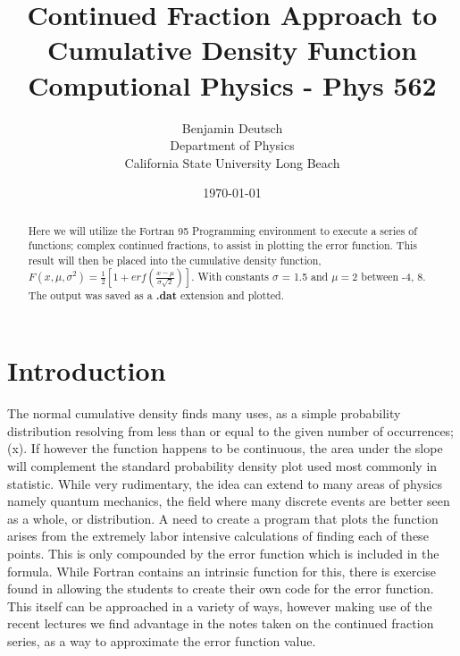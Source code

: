 \documentclass[12pt,letterpaper,notitlepage]{article}
\begin{document}




\title{%
	Continued Fraction Approach to Cumulative Density Function \\
\large Computional Physics - Phys 562}
\author{Benjamin Deutsch  \\
Department of Physics\\
California State University Long Beach}
\date{\today }

  
\maketitle



\begin{abstract}
Here we will utilize the Fortran 95 Programming environment to execute a series of functions; complex continued fractions, to assist in plotting the error function. This result will then be placed into the cumulative density function, ${F(x, \mu, \sigma^2) =\frac{1}{2}} \left[1+ erf \left( \frac{x -\mu}{\sigma\sqrt{2}} \right) \right]$. With constants ${\sigma}$ = 1.5 and ${\mu} = 2$ between -4, 8. The output was saved as a \textbf{.dat} extension and plotted.    
\end{abstract}

\section{Introduction}

The normal cumulative density finds many uses, as a simple probability distribution resolving from less than or equal to the given number of occurrences; (x). If however the function happens to be continuous, the area under the slope will complement the standard probability density plot used most commonly in statistic. While very rudimentary, the idea can extend to many areas of physics namely quantum mechanics, the field where many discrete events are better seen as a whole, or distribution. A need to create a program that plots the function arises from the extremely labor intensive calculations of finding each of these points. This is only compounded by the error function which is included in the formula. While Fortran contains an intrinsic function for this, there is exercise found in allowing the students to create their own code for the error function. This itself can be approached in a variety of ways, however making use of the recent lectures we find advantage in the notes taken on the continued fraction series, as a way to approximate the error function value. 
\end{document}
